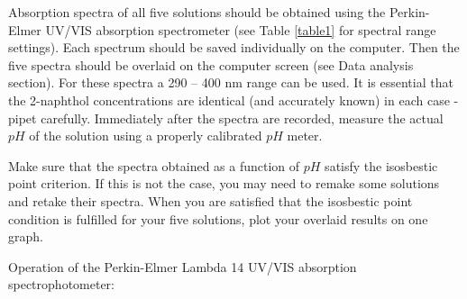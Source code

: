 \documentclass[byrevtex,amssymb,aps,pra,floatfix,letterpaper]{revtex4}
\begin{document}
Absorption spectra of all five solutions should be obtained using the Perkin-Elmer UV/VIS absorption spectrometer (see Table \ref{table1} for spectral range settings). Each spectrum should be saved individually on the computer. Then the five spectra should be overlaid on the computer screen (see Data analysis section). For these spectra a 290 -- 400 nm range can be used. It is essential that the 2-naphthol concentrations are identical (and accurately known) in each case - pipet carefully. Immediately after the spectra are recorded, measure the actual $pH$ of the solution using a properly calibrated $pH$ meter.

Make sure that the spectra obtained as a function of $pH$ satisfy the isosbestic point criterion. If this is not the case, you may need to remake some solutions and retake their spectra. When you are satisfied that the isosbestic point condition is fulfilled for your five solutions, plot your overlaid results on one graph.\\

\vspace{0.25cm}

\noindent
Operation of the Perkin-Elmer Lambda 14 UV/VIS absorption spectrophotometer:
\end{document}
